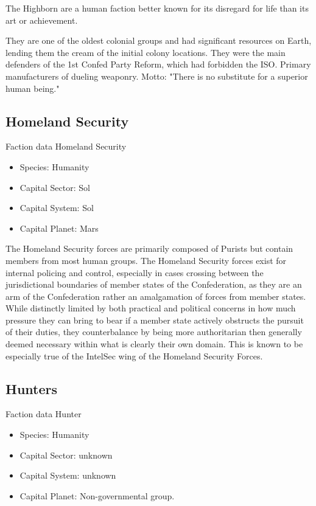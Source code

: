The Highborn are a human faction better known for its disregard for
life than its art or achievement.

They are one of the oldest colonial groups and had significant
resources on Earth, lending them the cream of the initial colony
locations. They were the main defenders of the 1st Confed Party
Reform, which had forbidden the ISO.  Primary manufacturers of dueling
weaponry.  Motto: "There is no substitute for a superior human being."

\subsection{Homeland Security}

Faction data Homeland Security
\begin{itemize}
\item Species: Humanity
\item Capital Sector: Sol
\item Capital System: Sol
\item Capital Planet: Mars
\end{itemize}

The Homeland Security forces are primarily composed of Purists but
contain members from most human groups. The Homeland Security forces
exist for internal policing and control, especially in cases crossing
between the jurisdictional boundaries of member states of the
Confederation, as they are an arm of the Confederation rather an
amalgamation of forces from member states. While distinctly limited by
both practical and political concerns in how much pressure they can
bring to bear if a member state actively obstructs the pursuit of
their duties, they counterbalance by being more authoritarian then
generally deemed necessary within what is clearly their own
domain. This is known to be especially true of the IntelSec wing of
the Homeland Security Forces.

\subsection{Hunters}

Faction data Hunter
\begin{itemize}
\item Species: Humanity
\item Capital Sector: unknown
\item Capital System: unknown
\item Capital Planet: Non-governmental group.
\end{itemize}

